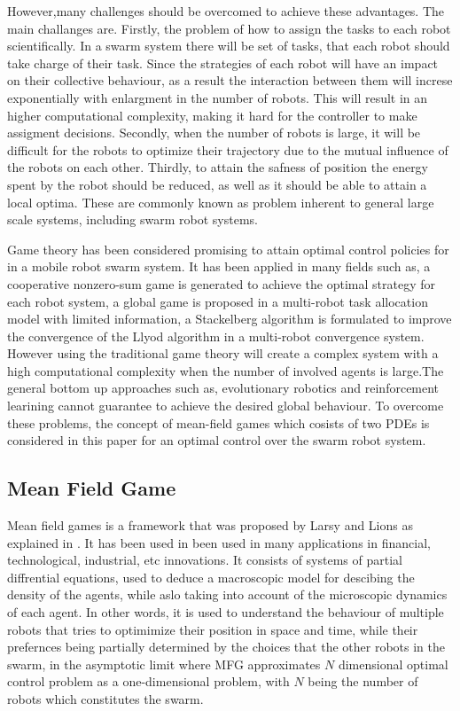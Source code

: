 \documentclass[a4paper, 10pt, conference]{ieeeconf}      %
\begin{document}
However,many challenges should be overcomed to achieve these advantages. The main challanges are. Firstly, the problem of how to assign the tasks to each robot scientifically. In a swarm system there will be set of tasks, that each robot should take charge of their task. Since the strategies of each robot will have an impact on their collective behaviour, as a result the interaction between them will increse exponentially with enlargment in the number of robots. This will result in an higher computational complexity, making it hard for the controller to make assigment decisions. Secondly, when the number of robots is large, it will be difficult for the robots to optimize their trajectory due to the mutual influence of the robots on each other\cite{b4}. Thirdly, to attain the safness of position the energy spent by the robot should be reduced, as well as it should be able to attain a local optima. These are commonly known as problem inherent to general large scale systems, including swarm robot systems\cite{b6}.  


Game theory has been considered promising to attain optimal control policies for in a mobile robot swarm system. It has been applied in many fields such as, a cooperative nonzero-sum game is generated to achieve the optimal strategy for each robot system, a global game is proposed in a multi-robot task allocation model with limited information, a Stackelberg algorithm is formulated to  improve the convergence of the Llyod algorithm in a multi-robot convergence system\cite{b6}. However using the traditional game theory will create a complex system with a high computational complexity when the number of involved agents is large.The general bottom up approaches such as, evolutionary robotics and reinforcement learining cannot guarantee to achieve the desired global behaviour\cite{b3}. To overcome these problems, the concept of mean-field games which cosists of two PDEs is considered in this paper for an optimal control over the swarm robot system.


\subsection{Mean Field Game}

Mean field games is a framework that was proposed by Larsy and Lions as explained in \cite{b1}. It has been used in been used in many applications in financial, technological, industrial, etc innovations\cite{b4}. It consists of systems of partial diffrential equations, used to deduce a macroscopic model for descibing the density of the agents, while aslo taking into account of the microscopic dynamics of each agent\cite{b1}\cite{b6}. In other words, it is used to understand the behaviour of multiple robots that tries to optimimize their position in space and time, while their prefernces being partially determined by the choices that the other robots in the swarm, in the asymptotic limit where\cite{b1} MFG approximates $N$ dimensional optimal control problem as a one-dimensional problem, with $N$ being the number of robots which constitutes the swarm\cite{b6}. 
\end{document}
